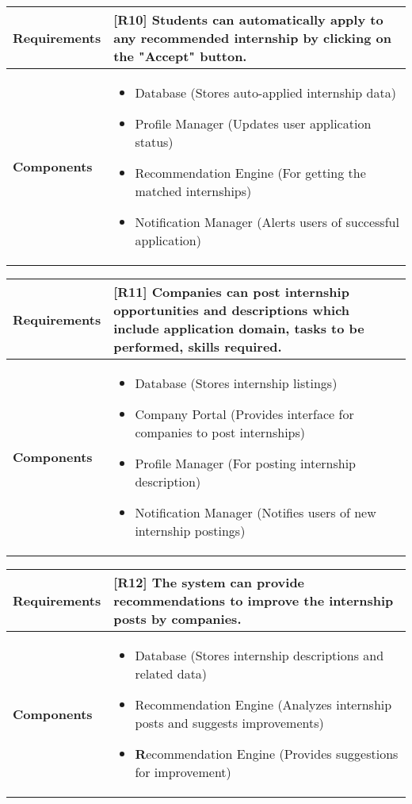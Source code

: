 \begin{table}[h!]
\centering
\begin{tabular}{|l|p{10cm}|}
\hline
\textbf{Requirements} & 
[R10] Students can automatically apply to any recommended internship by clicking on the "Accept" button.\\
\hline
\textbf{Components} & 
\begin{itemize}
    \item Database (Stores auto-applied internship data)
    \item Profile Manager (Updates user application status)
    \item Recommendation Engine (For getting the matched internships)
    \item Notification Manager (Alerts users of successful application)
\end{itemize} \\
\hline
\end{tabular}
\label{tab:req_comp}
\end{table}

\begin{table}[h!]
\centering
\begin{tabular}{|l|p{10cm}|}
\hline
\textbf{Requirements} & 
[R11] Companies can post internship opportunities and descriptions which include application domain, tasks to be performed, skills required.\\
\hline
\textbf{Components} & 
\begin{itemize}
    \item Database (Stores internship listings)
    \item Company Portal (Provides interface for companies to post internships)
    \item Profile Manager (For posting internship description)
    \item Notification Manager (Notifies users of new internship postings)
\end{itemize} \\
\hline
\end{tabular}
\label{tab:req_comp}
\end{table}

\begin{table}[h!]
\centering
\begin{tabular}{|l|p{10cm}|}
\hline
\textbf{Requirements} & 
[R12] The system can provide recommendations to improve the internship posts by companies.\\
\hline
\textbf{Components} & 
\begin{itemize}
    \item Database (Stores internship descriptions and related data)
    \item Recommendation Engine (Analyzes internship posts and suggests improvements)
    \item \textbf Recommendation Engine (Provides suggestions for improvement)
\end{itemize} \\
\hline
\end{tabular}
\label{tab:req_comp}
\end{table}

